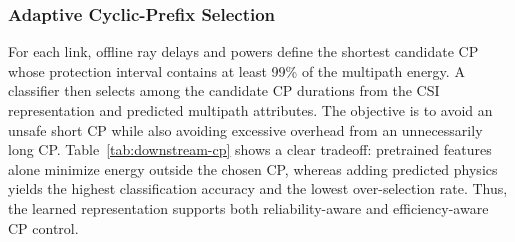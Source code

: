 \begin{table}[H]
\centering
\caption{Two-dimensional localization on the common test split. Lower is better for mean and median
error; higher is better for distance-threshold accuracy. Underlining marks the best result. The final
row compares the highlighted model with the best of the three language-model baselines (red:
improvement; blue: degradation); threshold accuracies are reported as percentage-point differences.}
\label{tab:downstream-localization}
\scriptsize
\setlength{\tabcolsep}{2.8pt}
\end{table}

\subsubsection{Adaptive Cyclic-Prefix Selection}

For each link, offline ray delays and powers define the shortest candidate CP whose protection
interval contains at least 99\% of the multipath energy. A classifier then selects among the
candidate CP durations from the CSI representation and predicted multipath attributes. The objective
is to avoid an unsafe short CP while also avoiding excessive overhead from an unnecessarily long CP.
Table~\ref{tab:downstream-cp} shows a clear tradeoff: pretrained features alone minimize energy
outside the chosen CP, whereas adding predicted physics yields the highest classification accuracy
and the lowest over-selection rate. Thus, the learned representation supports both reliability-aware
and efficiency-aware CP control.

